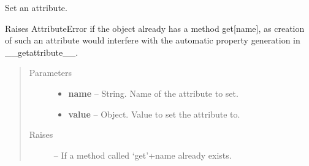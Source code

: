 \documentclass[letterpaper,10pt,english]{sphinxmanual}
\begin{document}
\begin{fulllineitems}

\begin{fulllineitems}
\label{eqtools:eqtools.core.PropertyAccessMixin.__setattr__}
Set an attribute.

Raises AttributeError if the object already has a method get{[}name{]}, as
creation of such an attribute would interfere with the automatic
property generation in \_\_getattribute\_\_.
\begin{quote}\begin{description}
\item[{Parameters }] \leavevmode\begin{itemize}
\item {} 
\textbf{name} --
String. Name of the attribute to set.

\item {} 
\textbf{value} --
Object. Value to set the attribute to.

\end{itemize}

\item[{Raises }] \leavevmode
{} -- 
If a method called `get'+name already exists.

\end{description}\end{quote}

\end{fulllineitems}


\end{fulllineitems}

\end{document}
